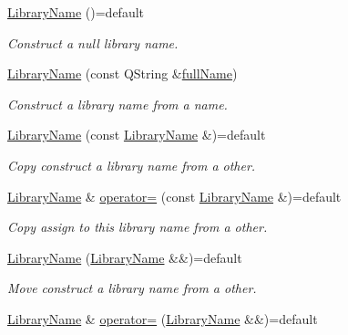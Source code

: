 \begin{DoxyCompactItemize}
\item 
\hyperlink{class_mdt_1_1_deploy_utils_1_1_library_name_a174f66647b7e49cd83c7354f72ba9404}{Library\+Name} ()=default
\begin{DoxyCompactList}\small\item\em Construct a null library name. \end{DoxyCompactList}\item 
\hyperlink{class_mdt_1_1_deploy_utils_1_1_library_name_a9179606c5c7fdd0f6e00d6c4d563aa00}{Library\+Name} (const Q\+String \&\hyperlink{class_mdt_1_1_deploy_utils_1_1_library_name_a2ca0dd90765abc0bd7082bc3f64da1c7}{full\+Name})
\begin{DoxyCompactList}\small\item\em Construct a library name from a name. \end{DoxyCompactList}\item 
\hyperlink{class_mdt_1_1_deploy_utils_1_1_library_name_a92d73ba6b45fce3ea7ea8979b795af1a}{Library\+Name} (const \hyperlink{class_mdt_1_1_deploy_utils_1_1_library_name}{Library\+Name} \&)=default
\begin{DoxyCompactList}\small\item\em Copy construct a library name from a other. \end{DoxyCompactList}\item 
\hyperlink{class_mdt_1_1_deploy_utils_1_1_library_name}{Library\+Name} \& \hyperlink{class_mdt_1_1_deploy_utils_1_1_library_name_adba93693bb7bb8bd5fc08881da9d5258}{operator=} (const \hyperlink{class_mdt_1_1_deploy_utils_1_1_library_name}{Library\+Name} \&)=default
\begin{DoxyCompactList}\small\item\em Copy assign to this library name from a other. \end{DoxyCompactList}\item 
\hyperlink{class_mdt_1_1_deploy_utils_1_1_library_name_a889abbf2405f93dfe07c260082512362}{Library\+Name} (\hyperlink{class_mdt_1_1_deploy_utils_1_1_library_name}{Library\+Name} \&\&)=default
\begin{DoxyCompactList}\small\item\em Move construct a library name from a other. \end{DoxyCompactList}\item 
\hyperlink{class_mdt_1_1_deploy_utils_1_1_library_name}{Library\+Name} \& \hyperlink{class_mdt_1_1_deploy_utils_1_1_library_name_af83d44949b9e29a45283b4fcf9c181a2}{operator=} (\hyperlink{class_mdt_1_1_deploy_utils_1_1_library_name}{Library\+Name} \&\&)=default

\end{DoxyCompactItemize}
